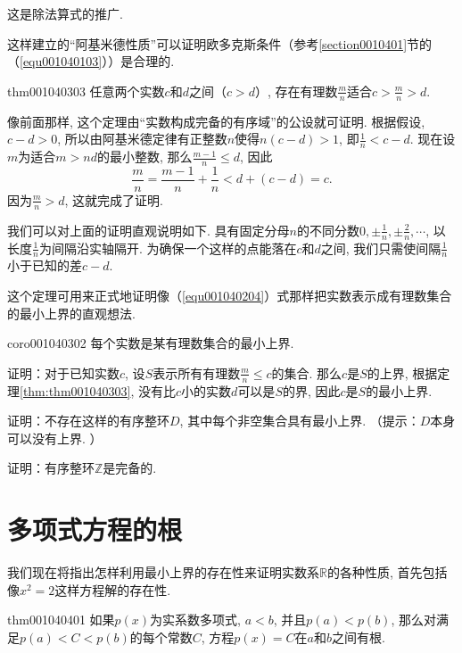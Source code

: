 这是除法算式的推广. 

这样建立的“阿基米德性质”可以证明欧多克斯条件（参考\ref{section0010401}节的（\ref{equ001040103}））是合理的. 

\begin{theorem}{}{thm001040303}
任意两个实数$c$和$d$之间（$c > d$）, 存在有理数$\frac{m}{n}$适合$c > \frac{m}{n} > d$. 
\end{theorem}

像前面那样, 这个定理由“实数构成完备的有序域”的公设就可证明. 根据假设, $c-d > 0$, 所以由阿基米德定律有正整数$n$使得$n(c-d)>1$, 即$\frac{1}{n} < c-d$. 现在设$m$为适合$m>nd$的最小整数, 那么$\frac{m-1}{n} \le d$, 因此
\[
\frac{m}{n} = \frac{m-1}{n} + \frac{1}{n} < d + (c-d)=c.
\]
因为$\frac{m}{n} > d$, 这就完成了证明. 

我们可以对上面的证明直观说明如下. 具有固定分母$n$的不同分数$0, \pm{\frac{1}{n}},\pm{\frac{2}{n}},\cdots$, 以长度$\frac{1}{n}$为间隔沿实轴隔开. 为确保一个这样的点能落在$c$和$d$之间, 我们只需使间隔$\frac{1}{n}$小于已知的差$c-d$. 

这个定理可用来正式地证明像（\ref{equ001040204}）式那样把实数表示成有理数集合的最小上界的直观想法. 

\begin{corollary}{}{coro001040302}
每个实数是某有理数集合的最小上界. 
\end{corollary}

证明：对于已知实数$c$, 设$S$表示所有有理数$\frac{m}{n} \le c$的集合. 那么$c$是$S$的上界, 根据定理\ref{thm:thm001040303}, 没有比$c$小的实数$d$可以是$S$的界, 因此$c$是$S$的最小上界. 

\begin{exercise}
证明：不存在这样的有序整环$D$, 其中每个非空集合具有最小上界. （提示：$D$本身可以没有上界. ）
\end{exercise}

\begin{exercise}
证明：有序整环$\mathbb{Z}$是完备的. 
\end{exercise}



\section{多项式方程的根}\label{section0010404}
我们现在将指出怎样利用最小上界的存在性来证明实数系$\mathbb{R}$的各种性质, 首先包括像$x^2=2$这样方程解的存在性. 
\begin{theorem}{}{thm001040401}
如果$p(x)$为实系数多项式, $a<b$, 并且$p(a)<p(b)$, 那么对满足$p(a)<C<p(b)$的每个常数$C$, 方程$p(x)=C$在$a$和$b$之间有根. 
\end{theorem}

